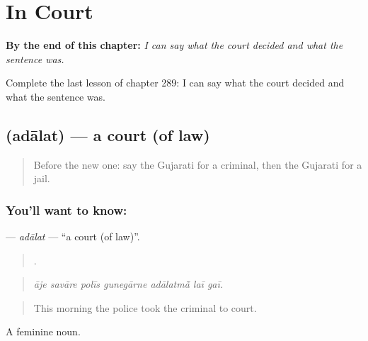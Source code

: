 
\chapter{In Court}
\label{ch:gu-in-court}

\begin{chapteropening}
\textbf{By the end of this chapter:} \emph{I can say what the court decided and what the sentence was.}

Complete the last lesson of chapter 289: I can say what the court decided and what the sentence was.
\end{chapteropening}

\section[\texorpdfstring{\gu{અદાલત} (adālat)}{અદાલત (adālat)}]{ (adālat) — a court (of law)}

\label{lesson:GU-C289-adalat}



\begin{quote}
Before the new one: say the Gujarati for a criminal, then the Gujarati for a jail.
\end{quote}

\subsection*{You'll want to know: }
\textbf{} — \emph{adālat} — \textquotedblleft{}a court (of law)\textquotedblright{}.

\begin{quote}
      .
\end{quote}

\begin{quote}
\emph{āje savāre polīs gunegārne adālatmā̃ laī gaī.}
\end{quote}

\begin{quote}
This morning the police took the criminal to court.
\end{quote}

A feminine noun.

